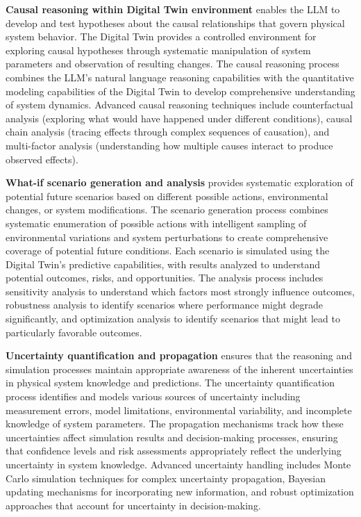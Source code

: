 \textbf{Causal reasoning within Digital Twin environment} enables the LLM to develop and test hypotheses about the causal relationships that govern physical system behavior. The Digital Twin provides a controlled environment for exploring causal hypotheses through systematic manipulation of system parameters and observation of resulting changes. The causal reasoning process combines the LLM's natural language reasoning capabilities with the quantitative modeling capabilities of the Digital Twin to develop comprehensive understanding of system dynamics. Advanced causal reasoning techniques include counterfactual analysis (exploring what would have happened under different conditions), causal chain analysis (tracing effects through complex sequences of causation), and multi-factor analysis (understanding how multiple causes interact to produce observed effects).

\textbf{What-if scenario generation and analysis} provides systematic exploration of potential future scenarios based on different possible actions, environmental changes, or system modifications. The scenario generation process combines systematic enumeration of possible actions with intelligent sampling of environmental variations and system perturbations to create comprehensive coverage of potential future conditions. Each scenario is simulated using the Digital Twin's predictive capabilities, with results analyzed to understand potential outcomes, risks, and opportunities. The analysis process includes sensitivity analysis to understand which factors most strongly influence outcomes, robustness analysis to identify scenarios where performance might degrade significantly, and optimization analysis to identify scenarios that might lead to particularly favorable outcomes.

\textbf{Uncertainty quantification and propagation} ensures that the reasoning and simulation processes maintain appropriate awareness of the inherent uncertainties in physical system knowledge and predictions. The uncertainty quantification process identifies and models various sources of uncertainty including measurement errors, model limitations, environmental variability, and incomplete knowledge of system parameters. The propagation mechanisms track how these uncertainties affect simulation results and decision-making processes, ensuring that confidence levels and risk assessments appropriately reflect the underlying uncertainty in system knowledge. Advanced uncertainty handling includes Monte Carlo simulation techniques for complex uncertainty propagation, Bayesian updating mechanisms for incorporating new information, and robust optimization approaches that account for uncertainty in decision-making.

